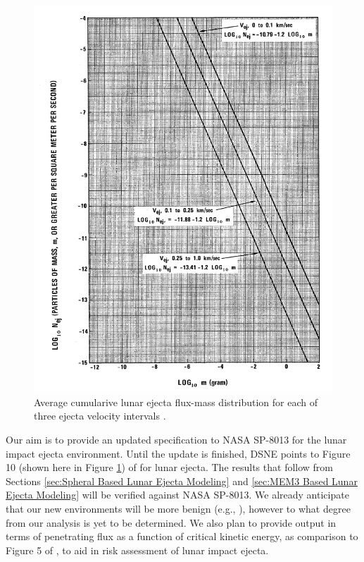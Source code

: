 \documentclass{hitec}
\numberwithin{equation}{section}
\begin{document}
\begin{figure}[h!]
	\centering
	\includegraphics[scale=0.5]{NASA-SP-8013-Fig10-flux-mass-distribution.PNG}
	\caption{Average cumularive lunar ejecta flux-mass distribution for each of three ejecta velocity intervals \citep{cour1969meteoroid}.}\label{fig:NASA-SP-8013-Fig10-flux-mass-distribution}
\end{figure}

Our aim is to provide an updated specification to NASA SP-8013 for the lunar impact ejecta environment. Until the update is finished, DSNE points to Figure 10 (shown here in Figure \ref{fig:NASA-SP-8013-Fig10-flux-mass-distribution}) of \cite{cour1969meteoroid} for lunar ejecta. The results that follow from Sections \ref{sec:Spheral Based Lunar Ejecta Modeling} and \ref{sec:MEM3 Based Lunar Ejecta Modeling} will be verified against NASA SP-8013. We already anticipate that our new environments will be more benign (e.g., \cite[][pointing out that $50$ J is the critial energy]{bjorkman2019astronaut}), however to what degree from our analysis is yet to be determined. We also plan to provide output in terms of penetrating flux as a function of critical kinetic energy, as comparison to Figure 5 of \cite{bjorkman2019astronaut}, to aid in risk assessment of lunar impact ejecta.
\end{document}

